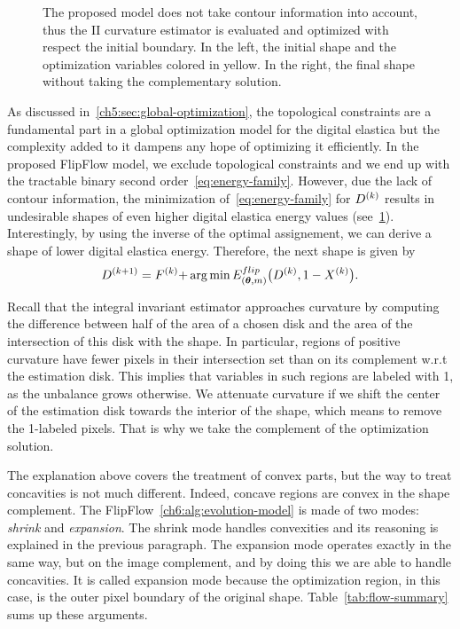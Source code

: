 \begin{figure}
\begin{minipage}{0.49\textwidth}
\label{ch6:fig:contour-info-2}
\end{minipage}%
\caption{  The proposed model does not take contour information into account, thus the II curvature estimator is evaluated and optimized with respect the initial boundary. In the left, the initial shape and the optimization variables colored in yellow. In the right, the final shape without taking the complementary solution.}
\label{ch6:fig:contour-info}
\end{figure}
 As discussed in~\cref{ch5:sec:global-optimization}, the topological constraints are a fundamental part in a global optimization model for the digital elastica but the complexity added to it dampens any hope of optimizing it efficiently. In the proposed FlipFlow model, we exclude topological constraints and we end up with the tractable binary second order~\cref{eq:energy-family}. However, due the lack of contour information, the minimization of~\cref{eq:energy-family} for $D^{(k)}$ results in undesirable shapes of even higher digital elastica energy values  (see~\cref{ch6:fig:contour-info}). Interestingly, by using the inverse of the optimal assignement, we can derive a shape of lower digital elastica energy. Therefore, the next shape is given by
\begin{align*}
	D^{(k+1)} = {\color{black}{F^{(k)} + }} \operatorname*{arg\,min} _{}{E_{(\bm{\theta},m)}^{flip}\big(D^{(k)},1-X^{(k)}} \big).
\end{align*}
%
Recall that the integral invariant estimator approaches curvature by computing the difference between half of the area
of a chosen disk and the area of the intersection of this disk with the shape.  In particular, regions of positive
curvature have fewer pixels in their intersection set than on its complement w.r.t the estimation disk. This implies
that variables in such regions are labeled with 1, as the unbalance grows otherwise. We attenuate curvature if we shift
the center of the estimation disk towards the interior of the shape, which means to remove the 1-labeled pixels. That is
why we take the complement of the optimization solution.


The explanation above covers the treatment of convex parts, but the way to treat concavities is not much different. Indeed, concave regions are convex in the shape complement. The FlipFlow~\cref{ch6:alg:evolution-model} is made of two modes: \emph{shrink} and \emph{expansion}. The shrink mode handles convexities and its reasoning is explained in the previous paragraph. The expansion mode operates exactly in the same way, but on the image complement, and by doing this we are able to handle
concavities. It is called expansion mode because the optimization region, in this case, is the outer pixel boundary of
the original shape. Table~\cref{tab:flow-summary} sums up these arguments.

